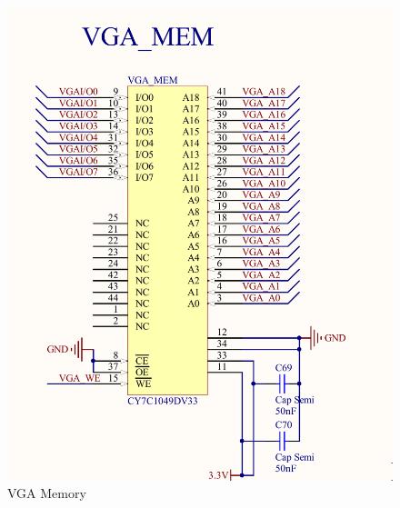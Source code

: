 \begin{figure}[h]
  \centering
  \includegraphics[width=\textwidth]{fig/pcb/schematics/pcbschematic_vgamem.pdf}
  \caption{VGA Memory}
  \label{fig:schematic-pcb-vgamem}
\end{figure}
